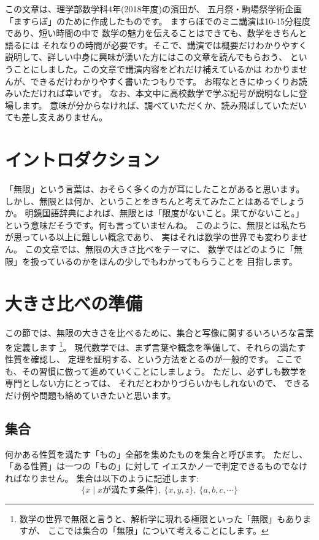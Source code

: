 \documentclass[./main]{subfiles} %
\theoremstyle{definition}
\begin{document}

この文章は、理学部数学科4年(2018年度)の濱田が、
五月祭・駒場祭学術企画「ますらぼ」のために作成したものです。
ますらぼでのミニ講演は10-15分程度であり、短い時間の中で
数学の魅力を伝えることはできても、数学をきちんと語るには
それなりの時間が必要です。そこで、講演では概要だけわかりやすく
説明して、詳しい中身に興味が湧いた方にはこの文章を読んでもらおう、
ということにしました。この文章で講演内容をどれだけ補えているかは
わかりませんが、できるだけわかりやすく書いたつもりです。
お暇なときにゆっくりお読みいただければ幸いです。
なお、本文中に高校数学で学ぶ記号が説明なしに登場します。
意味が分からなければ、調べていただくか、読み飛ばしていただいても差し支えありません。

\section{イントロダクション}
「無限」という言葉は、おそらく多くの方が耳にしたことがあると思います。
しかし、無限とは何か、ということをきちんと考えてみたことはあるでしょうか。
明鏡国語辞典によれば、無限とは「限度がないこと。果てがないこと。」
という意味だそうです。何も言っていませんね。
このように、無限とは私たちが思っている以上に難しい概念であり、
実はそれは数学の世界でも変わりません。
この文章では、無限の大きさ比べをテーマに、
数学ではどのように「無限」を扱っているのかをほんの少しでもわかってもらうことを
目指します。

\section{大きさ比べの準備}
この節では、無限の大きさを比べるために、集合と写像に関するいろいろな言葉を定義します
\footnote{数学の世界で無限と言うと、解析学に現れる極限といった「無限」もありますが、
ここでは集合の「無限」について考えることにします。}。
現代数学では、まず言葉や概念を準備して、それらの満たす性質を確認し、
定理を証明する、という方法をとるのが一般的です。
ここでも、その習慣に倣って進めていくことにしましょう。
ただし、必ずしも数学を専門としない方にとっては、
それだとわかりづらいかもしれないので、
できるだけ例や問題も絡めていきたいと思います。

\subsection{集合}
何かある性質を満たす「もの」全部を集めたものを集合と呼びます。
ただし、「ある性質」は一つの「もの」に対して
イエスかノーで判定できるものでなければなりません。
集合は以下のように記述します:
\[
\{x\mid xが満たす条件\},\ \{x,y,z\},\ \{a,b,c,\cdots\}
\]
\end{document}
